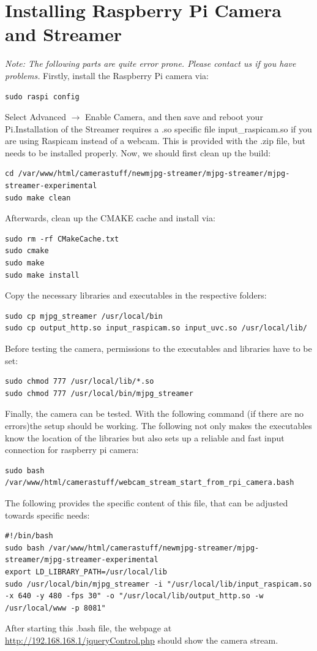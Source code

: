 \section{Installing Raspberry Pi Camera and Streamer}
\textit{Note: The following parts are quite error prone. Please contact us if you have problems.}
Firstly, install the Raspberry Pi camera via:
\begin{lstlisting}
sudo raspi config
\end{lstlisting}
Select Advanced $\rightarrow$ Enable Camera, and then save and reboot your Pi.Installation of the Streamer requires a .so specific file input\_raspicam.so if you are using Raspicam instead of a webcam. This is provided with the .zip file, but needs to be installed properly. Now, we should first clean up the build:
\begin{lstlisting}
cd /var/www/html/camerastuff/newmjpg-streamer/mjpg-streamer/mjpg-streamer-experimental
sudo make clean
\end{lstlisting}
Afterwards, clean up the CMAKE cache and install via:
\begin{lstlisting}
sudo rm -rf CMakeCache.txt
sudo cmake
sudo make
sudo make install
\end{lstlisting}
Copy the necessary libraries and executables in the respective folders:
\begin{lstlisting}
sudo cp mjpg_streamer /usr/local/bin
sudo cp output_http.so input_raspicam.so input_uvc.so /usr/local/lib/
\end{lstlisting}
Before testing the camera,  permissions to the executables and libraries have to be set:
\begin{lstlisting}
sudo chmod 777 /usr/local/lib/*.so
sudo chmod 777 /usr/local/bin/mjpg_streamer
\end{lstlisting}
Finally, the camera can be tested. With the following command (if there are no errors)the setup should be working. The following not only makes the executables know the location of the libraries but also sets up a reliable and fast input connection for raspberry pi camera:
\begin{lstlisting}
sudo bash /var/www/html/camerastuff/webcam_stream_start_from_rpi_camera.bash
\end{lstlisting}
The following provides the specific content of this file, that can be adjusted towards specific needs:
\begin{lstlisting}
#!/bin/bash
sudo bash /var/www/html/camerastuff/newmjpg-streamer/mjpg-streamer/mjpg-streamer-experimental 
export LD_LIBRARY_PATH=/usr/local/lib
sudo /usr/local/bin/mjpg_streamer -i "/usr/local/lib/input_raspicam.so -x 640 -y 480 -fps 30" -o "/usr/local/lib/output_http.so -w /usr/local/www -p 8081"
\end{lstlisting}
After starting this .bash file, the webpage at \url{http://192.168.168.1/jqueryControl.php} should show the camera stream.
\newpage
